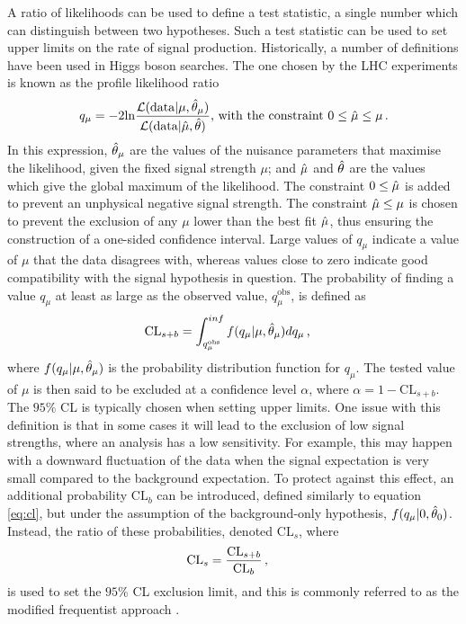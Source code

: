 A ratio of likelihoods can be used to define a test statistic, a single number which can distinguish between two hypotheses. Such a test statistic can be used to set upper limits on the rate of signal production. Historically, a number of definitions have been used in Higgs boson searches. The one chosen by the LHC experiments is known as the profile likelihood ratio
\begin{equation}
    q_{\mu} = -2 \mathrm{ln}\frac{\Lagr(\mathrm{data}| \mu, \Hat{\theta}_{\mu})}{\Lagr(\mathrm{data}|\Hat{\mu},\Hat{\theta})} \text{, with the constraint } 0\leq \Hat{\mu}\leq \mu \mend
\end{equation}
In this expression, $\Hat{\theta}_{\mu}$ are the values of the nuisance parameters that maximise the likelihood, given the fixed signal strength $\mu$; and $\Hat{\mu}$ and $\Hat{\theta}$ are the values which give the global maximum of the likelihood. The constraint $0\leq\Hat{\mu}$ is added to prevent an unphysical negative signal strength. The constraint $\Hat{\mu}\leq\mu$ is chosen to prevent the exclusion of any $\mu$ lower than the best fit $\Hat{\mu}$, thus ensuring the construction of a one-sided confidence interval. Large values of $q_{\mu}$ indicate a value of $\mu$ that the data disagrees with, whereas values close to zero indicate good compatibility with the signal hypothesis in question. The probability of finding a value $q_{\mu}$ at least as large as the observed value, $q_{\mu}^{\mathrm{obs}}$, is defined as
\begin{equation}
    \label{eq:cl}
    \mathrm{CL}_{s+b} = \int^{inf}_{q_{\mu}^{\mathrm{obs}}} f(q_{\mu}|\mu,\Hat{\theta}_{\mu})dq_{\mu} \msep
\end{equation}
where $f(q_{\mu}|\mu,\Hat{\theta}_{\mu})$ is the probability distribution function for $q_{\mu}$. The tested value of $\mu$ is then said to be excluded at a confidence level $\alpha$, where $\alpha = 1 - \mathrm{CL}_{s+b}$. The $95\%$ CL is typically chosen when setting upper limits. One issue with this definition is that in some cases it will lead to the exclusion of low signal strengths, where an analysis has a low sensitivity. For example, this may happen with a downward fluctuation of the data when the signal expectation is very small compared to the background expectation. To protect against this effect, an additional probability $\mathrm{CL}_b$ can be introduced, defined similarly to equation \ref{eq:cl}, but under the assumption of the background-only hypothesis, $f(q_{\mu}|0,\Hat{\theta}_0)$. Instead, the ratio of these probabilities, denoted $\mathrm{CL}_s$, where
\begin{equation}
    \mathrm{CL}_s = \frac{\mathrm{CL}_{s+b}}{\mathrm{CL}_b}\msep
\end{equation}
is used to set the $95\%$ CL exclusion limit, and this is commonly referred to as the modified frequentist approach \cite{Read_2002}.

